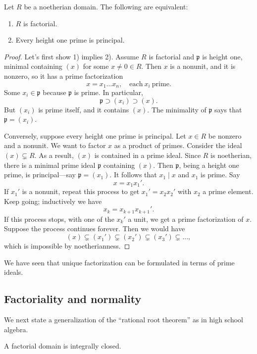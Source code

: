 \begin{theorem} \label{heightonefactoriality} 
Let $R$ be a noetherian domain. The following are equivalent:
\begin{enumerate}
\item $R$ is factorial. 
\item Every height one prime is principal.
\end{enumerate}
\end{theorem} 
\begin{proof} 
Let's first show 1) implies 2). Assume $R$ is factorial and $\mathfrak{p}$ is
height one, minimal containing $(x)$ for some $x \neq 0 \in R$. 
Then $x$ is a nonunit, and it is nonzero, so it has a prime factorization
\[ x = x_1 \dots x_n, \quad \mathrm{each \ } x_i \ \mathrm{prime}.  \]
Some $x_i \in \mathfrak{p}$ because $\mathfrak{p}$ is prime. In particular,
\[ \mathfrak{p} \supset (x_i) \supset (x).  \]
But $(x_i)$ is prime itself, and it contains $(x)$. The minimality of
$\mathfrak{p}$ says that $\mathfrak{p}  = (x_i)$. 

Conversely, suppose every height one prime is principal. Let $x \in R$ be
nonzero and a nonunit. We want
to factor $x$ as a product of primes. 
Consider the ideal $(x) \subsetneq R$. As a result, $(x)$ is contained in a
prime ideal. Since $R$ is noetherian, there is a minimal prime ideal
$\mathfrak{p}$ containing $(x)$.  Then $\mathfrak{p}$, being a height one
prime, is principal---say $\mathfrak{p}=(x_1)$. It follows that $x_1 \mid x$
and $x_1$ is prime.
Say 
\[ x = x_1 x_1'.  \]
If $x_1'$ is a nonunit, repeat this process to get $x_1' = x_2 x_2'$ with $x_2$ a prime element. 
Keep going; inductively we have
\[ x_k = x_{k+1}x_{k+1}'.  \]
If this process stops, with one of the $x_k'$  a  unit, we get a prime
factorization of $x$. Suppose the process
continues forever. Then we would have
\[ (x) \subsetneq (x_1') \subsetneq (x_2') \subsetneq (x_3') \subsetneq \dots,  \]
which is impossible by noetherianness. 
\end{proof} 

We have seen that unique factorization can be formulated in terms of prime
ideals.


\subsection{Factoriality and normality}

We next state a generalization of the ``rational root theorem'' as in high
school algebra.
\begin{proposition} \label{factorialimpliesnormal}
A factorial domain is integrally closed.
\end{proposition} 


